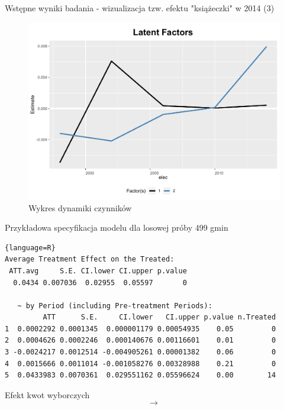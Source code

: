 \documentclass[12pt]{beamer}
\begin{document}
\begin{frame}{Wstępne wyniki badania - wizualizacja tzw. efektu "książeczki" w 2014 (3)}
    
\begin{figure}
\includegraphics[scale=0.43]{ife_no_pred_2_factors_sample_0_2_factors.pdf}
\caption{\label{fig:did}Wykres dynamiki czynników}
\end{figure}
    
\end{frame}

\begin{frame}[fragile]{Przykładowa specyfikacja modelu dla losowej próby 499 gmin}

\scriptsize

\begin{lstlisting}{language=R}
Average Treatment Effect on the Treated:
 ATT.avg     S.E. CI.lower CI.upper p.value
  0.0434 0.007036  0.02955  0.05597       0

   ~ by Period (including Pre-treatment Periods):
         ATT      S.E.     CI.lower   CI.upper p.value n.Treated
1  0.0002292 0.0001345  0.000001179 0.00054935    0.05         0
2  0.0004626 0.0002246  0.000140676 0.00116601    0.01         0
3 -0.0024217 0.0012514 -0.004905261 0.00001382    0.06         0
4  0.0015666 0.0011014 -0.001058276 0.00328988    0.21         0
5  0.0433983 0.0070361  0.029551162 0.05596624    0.00        14
\end{lstlisting}

\end{frame}

\begin{frame}{Efekt kwot wyborczych}
\[ \rightarrow \]
\end{frame}
\end{document}
